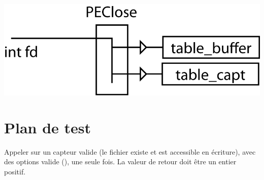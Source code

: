 \documentclass[11pt, a4paper]{article}
\begin{document}
\includegraphics{ressources/close.png}

\section{Plan de test}
{Appeler  sur un capteur valide (le fichier existe et est accessible en écriture), avec des options valide (), une seule fois.} 
{La valeur de retour doit être un entier positif.}~
\end{document}

